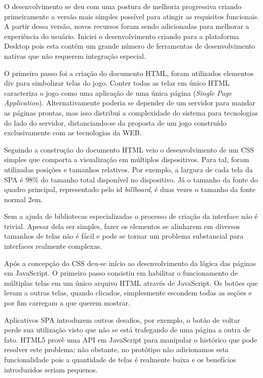 O desenvolvimento se deu com uma postura de melhoria progressiva
criando primeiramente  a versão mais simples possível para atingir as
requisitos funcionais. A partir dessa versão, novos recursos foram
sendo adicionadas para melhorar a experiência do usuário. Iniciei o
desenvolvimento criando para a plataforma Desktop pois esta contém
um grande número de ferramentas de desenvolvimento nativas que não
requerem integração especial.

O primeiro passo foi a criação do documento HTML, foram utilizados elementos div
para simbolizar telas do jogo. Conter todas as telas em único
HTML caracteriza o jogo como uma aplicação de uma única página
(\textit{Single Page Application}). Alternativamente poderia se depender
de um servidor para mandar as páginas prontas, mas isso distribui
a complexidade do sistema para tecnologias do lado do servidor,
distanciando-se da proposta de um jogo construído exclusivamente com as
tecnologias da WEB.

Seguindo a construção do documento HTML veio o desenvolvimento de um
CSS simples que comporta a visualização em múltiplos dispositivos.
Para tal, foram utilizadas posições e tamanhos relativos. Por exemplo,
a largura de cada tela da SPA é 98\% do tamanho total disponível no
dispositivo. Já o tamanho da fonte do quadro principal, representado pelo id
\textit{billboard}, é duas vezes o tamanho da fonte normal 2em.

Sem a ajuda de bibliotecas especializadas o processo de criação da
interface não é trivial. Apesar dela ser simples, fazer os
elementos se alinharem em diversos tamanhos de telas não é fácil e
pode se tornar um problema substancial para interfaces realmente complexas.

Após a concepção do CSS deu-se início ao desenvolvimento da lógica
das páginas em JavaScript. O primeiro passo consistiu em habilitar o
funcionamento de múltiplas telas em um único arquivo HTML através
de JavaScript. Os botões que levam a outras telas, quando clicados,
simplesmente escondem todas as seções e por fim carregam a que querem
mostrar.

Aplicativos SPA introduzem outros desafios, por exemplo,
o botão de voltar perde sua utilização visto que não se está
trafegando de uma página a outra de fato. HTML5 provê uma API em
JavaScript para manipular o histórico que pode resolver este problema;
não obstante, no protótipo não adicionamos esta funcionalidade pois
a quantidade de telas é realmente baixa e os benefícios introduzidos
seriam pequenos.

